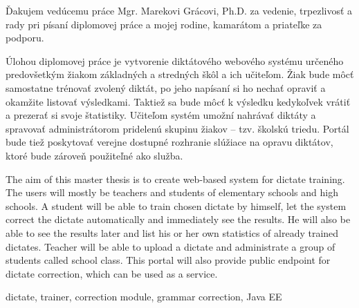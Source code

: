 \documentclass[12pt,oneside]{fithesis2}
\begin{document}
  \FrontMatter                    %
    \ThesisTitlePage                %
    \begin{ThesisDeclaration}       %
      \DeclarationText
      \AdvisorName
    \end{ThesisDeclaration}
    \begin{ThesisThanks}            %
      Ďakujem vedúcemu práce Mgr. Marekovi Grácovi, Ph.D. za vedenie, trpezlivosť a rady pri písaní diplomovej
       práce a mojej rodine, kamarátom a priateľke za podporu.
    \end{ThesisThanks}
    \begin{ThesisAbstract}          %
      Úlohou diplomovej práce je vytvorenie diktátového webového systému určeného predovšetkým žiakom základných
      a stredných škôl a ich učiteľom. Žiak bude môcť samostatne trénovať zvolený diktát, po jeho napísaní si ho nechať opraviť a okamžite listovať výsledkami. Taktiež sa bude môcť k výsledku kedykoľvek vrátiť a prezerať si svoje štatistiky. Učiteľom systém umožní nahrávať diktáty a spravovať administrátorom pridelenú skupinu žiakov -- tzv. školskú triedu. Portál bude tiež poskytovať verejne dostupné rozhranie slúžiace na opravu diktátov, ktoré bude zároveň použiteľné ako služba.
    \end{ThesisAbstract}
    \begin{ThesisAbstracten}          %

The aim of this master thesis is to create web-based system for dictate training. The users will mostly be teachers and students of elementary schools and high schools. A student will be able to train chosen dictate by himself, let the system correct the dictate automatically and immediately see the results. He will also be able to see the results later and list his or her own statistics of already trained dictates. Teacher will be able to upload a dictate and administrate a group of students called school class. This portal will also provide public endpoint for dictate correction, which can be used as a service.
    \end{ThesisAbstracten}
    
    
    \begin{ThesisKeyWords}          %
      dictate, trainer, correction module, grammar correction, Java EE
    \end{ThesisKeyWords}
    \tableofcontents                %
  
\end{document}
